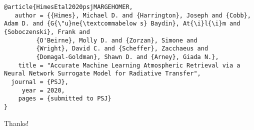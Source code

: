\documentclass[letterpaper, 12pt]{article}
\begin{document}
\begin{verbatim}
@article{HimesEtal2020psjMARGEHOMER,
   author = {{Himes}, Michael D. and {Harrington}, Joseph and {Cobb}, Adam D. and {G{\"u}ne{\textcommabelow s} Baydin}, At{\i}l{\i}m and {Soboczenski}, Frank and
         {O'Beirne}, Molly D. and {Zorzan}, Simone and
         {Wright}, David C. and {Scheffer}, Zacchaeus and
         {Domagal-Goldman}, Shawn D. and {Arney}, Giada N.},
    title = "Accurate Machine Learning Atmospheric Retrieval via a Neural Network Surrogate Model for Radiative Transfer",
  journal = {PSJ},
     year = 2020,
    pages = {submitted to PSJ}
}
\end{verbatim}

\noindent Thanks!


\end{document}
